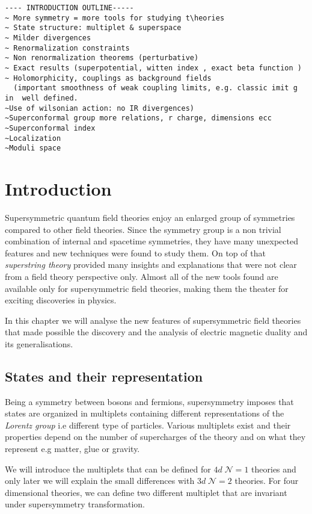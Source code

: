 \begin{lstlisting}
---- INTRODUCTION OUTLINE-----
~ More symmetry = more tools for studying t\heories
~ State structure: multiplet & superspace
~ Milder divergences 
~ Renormalization constraints
~ Non renormalization theorems (perturbative)
~ Exact results (superpotential, witten index , exact beta function )
~ Holomorphicity, couplings as background fields 
  (important smoothness of weak coupling limits, e.g. classic imit g in  well defined.
~Use of wilsonian action: no IR divergences)
~Superconformal group more relations, r charge, dimensions ecc
~Superconformal index
~Localization
~Moduli space
\end{lstlisting}

\section{Introduction}
Supersymmetric quantum field theories enjoy an enlarged group of  symmetries compared to other field theories. 
Since the symmetry group is a non trivial combination of internal and spacetime symmetries, they have many unexpected features and new techniques were found to study them.
On top of that \emph{superstring theory} provided many insights and explanations that were not clear from a field theory perspective only. 
Almost all of the new tools found are available only for supersymmetric field theories, making them the theater for exciting discoveries in physics.

In this chapter we will analyse the new features of supersymmetric field theories that made possible the discovery and the analysis of electric magnetic duality and its generalisations.

\subsection{ States and their representation}

Being a symmetry between bosons and fermions, supersymmetry imposes that states are organized in multiplets containing different representations of the \emph{Lorentz group} i.e different type of  particles.
Various multiplets exist and their properties depend on the number of supercharges of the theory and on what they represent e.g matter, glue or gravity. 

We will introduce the multiplets that can be defined for $4d \; \mathcal{N} = 1$ theories and only later we will explain the small differences with $3d \; \mathcal{N} = 2$ theories.
For four dimensional theories, we can define two different multiplet that are invariant under supersymmetry transformation.

